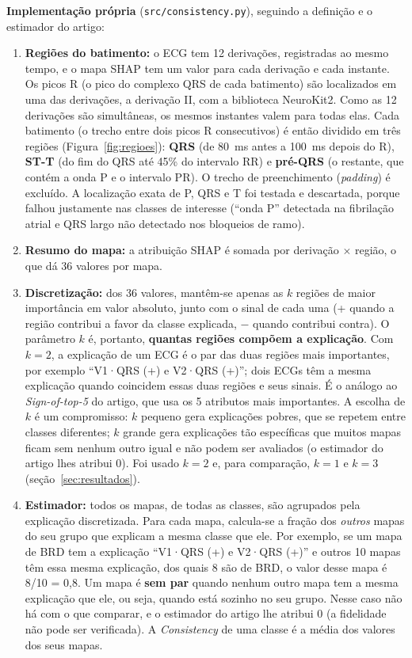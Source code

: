 \documentclass[11pt,a4paper]{article}
\begin{document}
\textbf{Implementação própria} (\texttt{src/consistency.py}), seguindo a definição e o estimador do artigo:
\begin{enumerate}
    \item \textbf{Regiões do batimento:} o ECG tem 12 derivações, registradas ao mesmo tempo, e o mapa SHAP tem um valor para cada derivação e cada instante. Os picos R (o pico do complexo QRS de cada batimento) são localizados em uma das derivações, a derivação II, com a biblioteca NeuroKit2. Como as 12 derivações são simultâneas, os mesmos instantes valem para todas elas. Cada batimento (o trecho entre dois picos R consecutivos) é então dividido em três regiões (Figura~\ref{fig:regioes}): \textbf{QRS} (de 80~ms antes a 100~ms depois do R), \textbf{ST-T} (do fim do QRS até 45\% do intervalo RR) e \textbf{pré-QRS} (o restante, que contém a onda P e o intervalo PR). O trecho de preenchimento (\textit{padding}) é excluído. A localização exata de P, QRS e T foi testada e descartada, porque falhou justamente nas classes de interesse (``onda P'' detectada na fibrilação atrial e QRS largo não detectado nos bloqueios de ramo).
    \item \textbf{Resumo do mapa:} a atribuição SHAP é somada por derivação $\times$ região, o que dá 36 valores por mapa.
    \item \textbf{Discretização:} dos 36 valores, mantêm-se apenas as $k$ regiões de maior importância em valor absoluto, junto com o sinal de cada uma (+ quando a região contribui a favor da classe explicada, $-$ quando contribui contra). O parâmetro $k$ é, portanto, \textbf{quantas regiões compõem a explicação}. Com $k = 2$, a explicação de um ECG é o par das duas regiões mais importantes, por exemplo ``V1·QRS (+) e V2·QRS (+)''; dois ECGs têm a mesma explicação quando coincidem essas duas regiões e seus sinais. É o análogo ao \textit{Sign-of-top-5} do artigo, que usa os 5 atributos mais importantes. A escolha de $k$ é um compromisso: $k$ pequeno gera explicações pobres, que se repetem entre classes diferentes; $k$ grande gera explicações tão específicas que muitos mapas ficam sem nenhum outro igual e não podem ser avaliados (o estimador do artigo lhes atribui 0). Foi usado $k = 2$ e, para comparação, $k = 1$ e $k = 3$ (seção~\ref{sec:resultados}).
    \item \textbf{Estimador:} todos os mapas, de todas as classes, são agrupados pela explicação discretizada. Para cada mapa, calcula-se a fração dos \emph{outros} mapas do seu grupo que explicam a mesma classe que ele. Por exemplo, se um mapa de BRD tem a explicação ``V1·QRS (+) e V2·QRS (+)'' e outros 10 mapas têm essa mesma explicação, dos quais 8 são de BRD, o valor desse mapa é 8/10 = 0,8. Um mapa é \textbf{sem par} quando nenhum outro mapa tem a mesma explicação que ele, ou seja, quando está sozinho no seu grupo. Nesse caso não há com o que comparar, e o estimador do artigo lhe atribui 0 (a fidelidade não pode ser verificada). A \textit{Consistency} de uma classe é a média dos valores dos seus mapas.
\end{enumerate}
\end{document}
